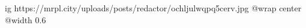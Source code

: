  
 
 
 
 

\ifcmt
  ig https://mrpl.city/uploads/posts/redactor/ochljulwqpq5cerv.jpg
  @wrap center
  @width 0.6
\fi
